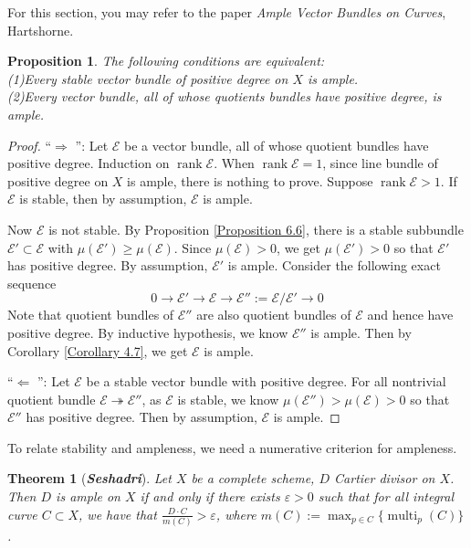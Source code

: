 \documentclass{ctexart}
\newtheorem{theorem}{Theorem}[section]
\newtheorem{proposition}{Proposition}[section]
\newcommand{\leftquotes}{\textquotedblleft}
\newcommand{\rightquotes}{\textquotedblright}
\newcommand{\rank}{\operatorname{rank}}
\newcommand{\multiplicity}{\operatorname{multi}}
\begin{document}
For this section, you may refer to the paper \emph{Ample Vector Bundles on Curves}, Hartshorne.
\begin{proposition}
    The following conditions are equivalent: \\
    (1)Every stable vector bundle of positive degree on $X$ is ample. \\
    (2)Every vector bundle, all of whose quotients bundles have positive degree, is ample.
    \label{Proposition 6.8}
\end{proposition}
\begin{proof}
    \leftquotes $\Rightarrow$ \rightquotes : Let $\mathcal{E}$ be a vector bundle, all of whose quotient bundles have positive degree.
    Induction on $\rank \mathcal{E}$.
    When $\rank \mathcal{E} = 1$, since line bundle of positive degree on $X$ is ample, there is nothing to prove.
    Suppose $\rank \mathcal{E} > 1$.
    If $\mathcal{E}$ is stable, then by assumption, $\mathcal{E}$ is ample.
    \par
    Now $\mathcal{E}$ is not stable.
    By Proposition \ref{Proposition 6.6}, there is a stable subbundle $\mathcal{E}' \subset \mathcal{E}$ with $\mu(\mathcal{E}') \ge \mu(\mathcal{E})$.
    Since $\mu(\mathcal{E}) > 0$, we get $\mu(\mathcal{E}') > 0$ so that $\mathcal{E}'$ has positive degree.
    By assumption, $\mathcal{E}'$ is ample.
    Consider the following exact sequence
    \begin{equation}
        0 \longrightarrow \mathcal{E}' \longrightarrow \mathcal{E} \longrightarrow \mathcal{E}'' := \mathcal{E}/\mathcal{E}' \longrightarrow 0
    \end{equation}  
    Note that quotient bundles of $\mathcal{E}''$ are also quotient bundles of $\mathcal{E}$ and hence have positive degree.
    By inductive hypothesis, we know $\mathcal{E}''$ is ample.
    Then by Corollary \ref{Corollary 4.7}, we get $\mathcal{E}$ is ample.
    \par
    \leftquotes $\Leftarrow$ \rightquotes : Let $\mathcal{E}$ be a stable vector bundle with positive degree.
    For all nontrivial quotient bundle $\mathcal{E} \twoheadrightarrow \mathcal{E}''$,
    as $\mathcal{E}$ is stable, we know $\mu(\mathcal{E}'') > \mu(\mathcal{E}) > 0$ so that $\mathcal{E}''$ has positive degree.
    Then by assumption, $\mathcal{E}$ is ample.
\end{proof}
To relate stability and ampleness, we need a numerative criterion for ampleness.
\begin{theorem}[\textbf{\emph{Seshadri}}]
    Let $X$ be a complete scheme, $D$ Cartier divisor on $X$.
    Then $D$ is ample on $X$ if and only if there exists $\varepsilon > 0$ such that for all integral curve $C \subset X$,
    we have that $\frac{D \cdot C}{m(C)} > \varepsilon$, where $m(C) := \max_{p\in C} \{\multiplicity_{p}(C)\}$.
    \label{Theorem 6.1}
\end{theorem}
\end{document}
